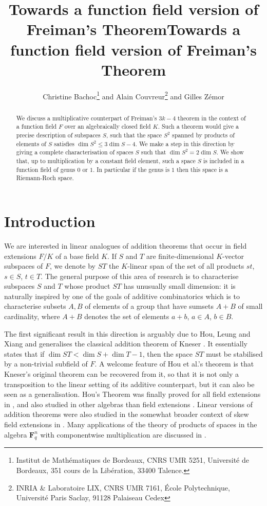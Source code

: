 \documentclass{article}
\title{Towards a function field version of Freiman's Theorem}
\title{Towards a function field version of Freiman's Theorem}
\author{Christine Bachoc\thanks{
Institut de Mathématiques de Bordeaux, CNRS UMR
    5251, Université de Bordeaux, 351 cours de la Libération, 33400 Talence.} and
  Alain Couvreur\thanks{INRIA \& Laboratoire LIX, CNRS UMR 7161,
    \'Ecole Polytechnique, Université Paris Saclay, 
    91128 Palaiseau Cedex} and
  Gilles Z\'emor\samethanks[1]}
\theoremstyle{plain}
\theoremstyle{definition}
\theoremstyle{remark}
\newcommand{\F}{\mathbf{F}}
\renewcommand{\leq}{\leqslant}
\begin{document}
\maketitle

\begin{abstract}
  We discuss a multiplicative counterpart of Freiman's $3k-4$ theorem
  in the context of a function field $F$ over an algebraically closed
  field $K$. Such a theorem would
  give a precise description of subspaces $S$, such that the space
  $S^2$ spanned by products of elements of $S$ satisfies
  $\dim S^2 \leq 3 \dim S-4$. We make a step in this direction by
  giving a complete characterisation of spaces $S$ such that
  $\dim S^2 = 2 \dim S$.  We show that, up to multiplication by a
  constant field element, such a space $S$ is included in a function
  field of genus $0$ or $1$.  In particular if the genus is $1$ then
  this space is a Riemann-Roch space.
\end{abstract}


\section{Introduction}

We are interested in linear analogues of addition theorems that occur
in field extensions $F/K$ of a base field $K$. If $S$ and $T$ are
finite-dimensional $K$-vector subspaces of $F$, we denote by $ST$
the $K$-linear span of the set of all products $st$, $s\in S$, $t\in T$.
The general purpose of this area of research is to characterise
subspaces $S$ and $T$ whose product $ST$ has unusually small
dimension: it is naturally inspired by one of the goals of additive combinatorics 
which is to characterise subsets $A,B$ of elements of a group that have
sumsets $A+B$ of small cardinality, where $A+B$ denotes the set of
elements $a+b$, $a\in A$, $b\in B$.

The first significant result in this direction is arguably due to
Hou, Leung and Xiang \cite{hlx02} and generalises the classical
addition theorem of Kneser \cite{kneser}. It essentially states that if
$\dim ST < \dim S + \dim T -1$, then the space $ST$ must be stabilised
by a non-trivial subfield of $F$.
A welcome feature of Hou et
al.'s theorem is that Kneser's original theorem can be recovered from
it, so that it is not only a transposition to the linear setting of
its additive counterpart, but it can also be seen as a generalisation.
Hou's Theorem was finally proved for all field extensions in
\cite{bszKneser}, and also studied in other algebras than field
extensions \cite{bl15,mz15}.
Linear versions of addition theorems were also studied in the somewhat
broader context of skew field extensions in
\cite{el09}. {Many applications of the theory of
  products of spaces in the algebra $\F_q^n$ with componentwise
  multiplication are discussed in \cite{hugues}.} 
\end{document}
